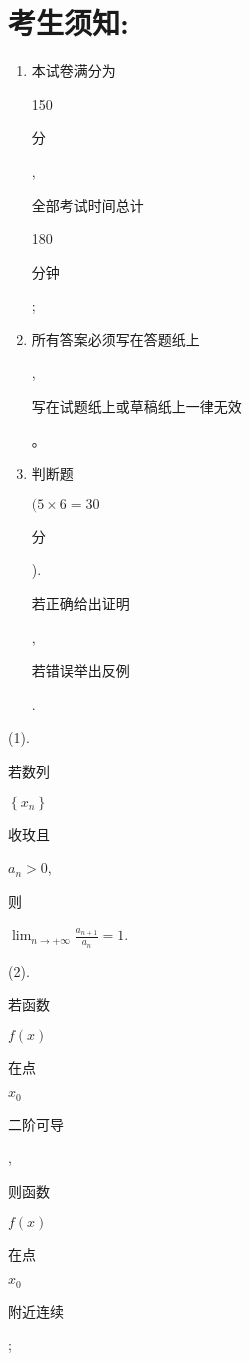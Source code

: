 \documentclass[10pt]{article}
\begin{document}
\section{考生须知:}
\begin{enumerate}
  \item \begin{CJK}{UTF8}{mj}本试卷满分为\end{CJK} 150 \begin{CJK}{UTF8}{mj}分\end{CJK}, \begin{CJK}{UTF8}{mj}全部考试时间总计\end{CJK} 180 \begin{CJK}{UTF8}{mj}分钟\end{CJK};

  \item \begin{CJK}{UTF8}{mj}所有答案必须写在答题纸上\end{CJK}, \begin{CJK}{UTF8}{mj}写在试题纸上或草稿纸上一律无效\end{CJK}。

  \item \begin{CJK}{UTF8}{mj}判断题\end{CJK} $(5 \times 6=30$ \begin{CJK}{UTF8}{mj}分\end{CJK}). \begin{CJK}{UTF8}{mj}若正确给出证明\end{CJK}, \begin{CJK}{UTF8}{mj}若错误举出反例\end{CJK}.

\end{enumerate}
(1). \begin{CJK}{UTF8}{mj}若数列\end{CJK} $\left\{x_{n}\right\}$ \begin{CJK}{UTF8}{mj}收玫且\end{CJK} $a_{n}>0$, \begin{CJK}{UTF8}{mj}则\end{CJK} $\lim _{n \rightarrow+\infty} \frac{a_{n+1}}{a_{n}}=1$.

(2). \begin{CJK}{UTF8}{mj}若函数\end{CJK} $f(x)$ \begin{CJK}{UTF8}{mj}在点\end{CJK} $x_{0}$ \begin{CJK}{UTF8}{mj}二阶可导\end{CJK}, \begin{CJK}{UTF8}{mj}则函数\end{CJK} $f(x)$ \begin{CJK}{UTF8}{mj}在点\end{CJK} $x_{0}$ \begin{CJK}{UTF8}{mj}附近连续\end{CJK};
\end{document}
